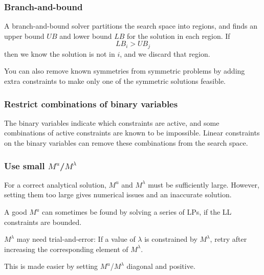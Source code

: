 \subsubsection{Branch-and-bound}
A branch-and-bound solver partitions the search space into regions, and finds an upper bound $UB$ and lower bound $LB$ for the solution in each region. If
%
\begin{equation}
  LB_i > UB_j
\end{equation}
%
then we know the solution is not in $i$, and we discard that region.

You can also remove known symmetries from symmetric problems by adding extra constraints to make only one of the symmetric solutions feasible.

\subsubsection{Restrict combinations of binary variables}
The binary variables indicate which constraints are active, and some combinations of active constraints are known to be impossible. Linear constraints on the binary variables can remove these combinations from the search space.

\subsubsection{Use small $M^u$/$M^\lambda$}
For a correct analytical solution, $M^u$ and $M^\lambda$ must be sufficiently large. However, setting them too large gives numerical issues and an inaccurate solution.

A good $M^u$ can sometimes be found by solving a series of LPs, if the LL constraints are bounded.

$M^\lambda$ may need trial-and-error: If a value of $\lambda$ is constrained by $M^\lambda$, retry after increasing the corresponding element of $M^\lambda$.

This is made easier by setting $M^u$/$M^\lambda$ diagonal and positive.

